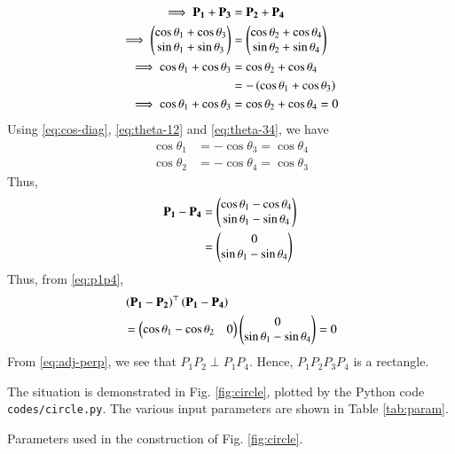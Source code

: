 \documentclass[journal,12pt,twocolumn]{IEEEtran}
\begin{document}
\begin{enumerate}
\begin{align}
        \implies \mathbf{P_1}+\mathbf{P_3} &= \mathbf{P_2}+\mathbf{P_4} \\
        \implies \begin{pmatrix}\cos\theta_1+\cos\theta_3\\\sin\theta_1+\sin\theta_3\end{pmatrix} &= \begin{pmatrix}\cos\theta_2+\cos\theta_4\\\sin\theta_2+\sin\theta_4\end{pmatrix} \\
        \implies \cos\theta_1+\cos\theta_3 &= \cos\theta_2+\cos\theta_4 \\
                                           &= -\left(\cos\theta_1+\cos\theta_3\right) \\
        \implies \cos\theta_1+\cos\theta_3 &= \cos\theta_2+\cos\theta_4 = 0
        \label{eq:cos-diag}
    \end{align}
    Using \eqref{eq:cos-diag}, \eqref{eq:theta-12} and \eqref{eq:theta-34}, we have
    \begin{align}
        \cos\theta_1 &= -\cos\theta_3 = \cos\theta_4 \\
        \cos\theta_2 &= -\cos\theta_4 = \cos\theta_3
        \label{eq:theta-14-23}
    \end{align}
    Thus,
    \begin{align}
        \mathbf{P_1} - \mathbf{P_4} &= \begin{pmatrix}\cos\theta_1-\cos\theta_4\\\sin\theta_1-\sin\theta_4\end{pmatrix} \\
                              &= \begin{pmatrix}0\\\sin\theta_1-\sin\theta_4\end{pmatrix}
                              \label{eq:p1p4}
    \end{align}
    Thus, from \eqref{eq:p1p4},
    \begin{align}
        &\left(\mathbf{P_1}-\mathbf{P_2}\right)^\top\left(\mathbf{P_1}-\mathbf{P_4}\right) \nonumber \\
        &= \begin{pmatrix}\cos\theta_1-\cos\theta_2&0\end{pmatrix}\begin{pmatrix}0\\\sin\theta_1-\sin\theta_4\end{pmatrix} = 0
        \label{eq:adj-perp}
    \end{align}
    From \eqref{eq:adj-perp}, we see that $P_1P_2 \perp P_1P_4$. Hence, $P_1P_2P_3P_4$ is
    a rectangle.

    The situation is demonstrated in Fig. \ref{fig:circle}, plotted by the Python
    code \texttt{codes/circle.py}. The various input parameters are shown in Table
    \ref{tab:param}.
    \begin{table}[!ht]
        \centering
        
        \caption{Parameters used in the construction of Fig. \ref{fig:circle}.}
        \label{tab:param}
    \end{table}
    

\end{enumerate}
\end{document}
